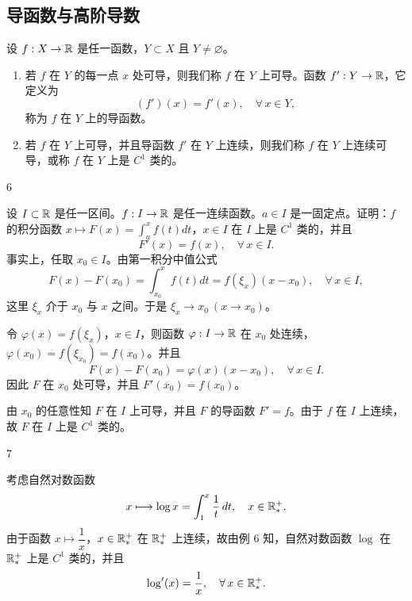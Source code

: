 \subsection{导函数与高阶导数}
	\label{sec:6-1-5}

\begin{mydef*}{}

	设 \(f:X\to\mathbb{R}\) 是任一函数，\(Y\subset X\) 且 \(Y\neq\varnothing\)。

	\begin{enumerate}[label=\arabic*)]
		\item 若 \(f\) 在 \(Y\) 的每一点 \(x\) 处可导，则我们称 \(f\) 在 \(Y\) 上可导。函数 \(f':Y\to\mathbb{R}\)，它定义为
		\[
		(f')(x)=f'(x),\quad\forall\,x\in Y,
		\]
		称为 \(f\) 在 \(Y\) 上的导函数。

		\item 若 \(f\) 在 \(Y\) 上可导，并且导函数 \(f'\) 在 \(Y\) 上连续，则我们称 \(f\) 在 \(Y\) 上连续可导，或称 \(f\) 在 \(Y\) 上是 \(C^1\) 类的。
	\end{enumerate}

\end{mydef*}

\begin{sourceexample}{6}

	设 \(I\subset\mathbb{R}\) 是任一区间。\(f:I\to\mathbb{R}\) 是任一连续函数。\(a\in I\) 是一固定点。证明：\(f\) 的积分函数 \(x\longmapsto F(x)=\displaystyle\int_a^x f(t)dt\)，\(x\in I\) 在 \(I\) 上是 \(C^1\) 类的，并且
	\[
	F'(x)=f(x),\quad\forall\,x\in I.
	\]
	事实上，任取 \(x_0\in I\)。由第一积分中值公式
	\[
	F(x)-F(x_0)=\int_{x_0}^x f(t)dt=f(\xi_x)(x-x_0),\quad\forall\,x\in I,
	\]
	这里 \(\xi_x\) 介于 \(x_0\) 与 \(x\) 之间。于是 \(\xi_x\to x_0\ (x\to x_0)\)。

	令 \(\varphi(x)=f(\xi_x)\)，\(x\in I\)，则函数 \(\varphi:I\to\mathbb{R}\) 在 \(x_0\) 处连续，\(\varphi(x_0)=f(\xi_{x_0})=f(x_0)\)。并且
	\[
	F(x)-F(x_0)=\varphi(x)(x-x_0),\quad\forall\,x\in I.
	\]
	因此 \(F\) 在 \(x_0\) 处可导，并且 \(F'(x_0)=f(x_0)\)。

	由 \(x_0\) 的任意性知 \(F\) 在 \(I\) 上可导，并且 \(F\) 的导函数 \(F'=f\)。由于 \(f\) 在 \(I\) 上连续，故 \(F\) 在 \(I\) 上是 \(C^1\) 类的。

\end{sourceexample}

\begin{sourceexample}{7}

	考虑自然对数函数
	\[
	x\longmapsto\log x=\int_1^x\frac1t\,dt,\quad x\in\mathbb{R}_*^+.
	\]
	由于函数 \(x\longmapsto\dfrac1x\)，\(x\in\mathbb{R}_*^+\) 在 \(\mathbb{R}_*^+\) 上连续，故由例 6 知，自然对数函数 \(\log\) 在 \(\mathbb{R}_*^+\) 上是 \(C^1\) 类的，并且
	\[
	\log'(x)=\frac1x,\quad\forall\,x\in\mathbb{R}_*^+.
	\]

\end{sourceexample}

